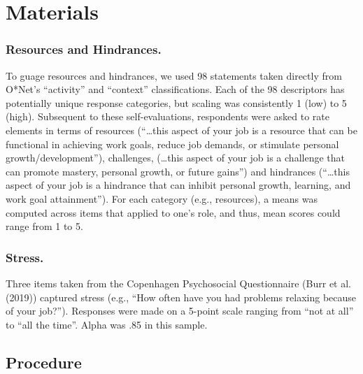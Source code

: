 \documentclass[
  man]{apa6}
\begin{document}
\hypertarget{materials}{%
\section{Materials}\label{materials}}

\hypertarget{resources-and-hindrances.}{%
\subsubsection{Resources and Hindrances.}\label{resources-and-hindrances.}}

To guage resources and hindrances, we used 98 statements taken directly from O*Net's ``activity'' and ``context'' classifications. Each of the 98 descriptors has potentially unique response categories, but scaling was consistently 1 (low) to 5 (high). Subsequent to these self-evaluations, respondents were asked to rate elements in terms of resources (``\ldots this aspect of your job is a resource that can be functional in achieving work goals, reduce job demands, or stimulate personal growth/development''), challenges, (\ldots this aspect of your job is a challenge that can promote mastery, personal growth, or future gains'') and hindrances (``\ldots this aspect of your job is a hindrance that can inhibit personal growth, learning, and work goal attainment''). For each category (e.g., resources), a means was computed across items that applied to one's role, and thus, mean scores could range from 1 to 5.

\hypertarget{stress.}{%
\subsubsection{Stress.}\label{stress.}}

Three items taken from the Copenhagen Psychosocial Questionnaire (Burr et al. (2019)) captured stress (e.g., ``How often have you had problems relaxing because of your job?''). Responses were made on a 5-point scale ranging from ``not at all'' to ``all the time''. Alpha was .85 in this sample.

\hypertarget{procedure}{%
\subsection{Procedure}\label{procedure}}
\end{document}
